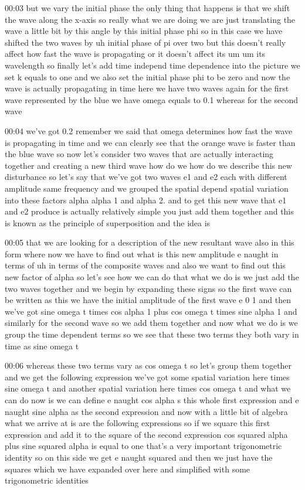 00:03
but we vary the initial phase the only thing that happens
is that we shift the wave along the x-axis so really what we are doing we
are just translating the wave a little bit by this angle
by this initial phase phi so in this case we have shifted
the two waves by uh initial phase of pi over two but this doesn't really affect
how fast the wave is propagating or it doesn't affect its um um its wavelength
so finally let's add time independ time dependence into the picture
we set k equals to one and we also set the initial phase
phi to be zero and now the wave is actually propagating in time
here we have two waves again for the first wave represented by the blue
we have omega equals to 0.1 whereas for the second wave

00:04
we've got 0.2 remember we said that omega determines how fast
the wave is propagating in time and we can clearly see that the orange wave
is faster than the blue wave so now let's consider two waves that are
actually interacting together and creating a new third wave how do we
how do we describe this new disturbance so let's say that we've got two waves e1
and e2 each with different amplitude same frequency and
we grouped the spatial depend spatial variation into these factors
alpha alpha 1 and alpha 2. and to get this new wave that e1 and e2 produce
is actually relatively simple you just add them together and this is known as
the principle of superposition and the idea is

00:05
that we are looking for a description of the new
resultant wave also in this form where now we have to
find out what is this new amplitude e naught in terms of uh in terms of the
composite waves and also we want to find out this new factor of alpha
so let's see how we can do that what we do is
we just add the two waves together and we begin by expanding
these signs so the first wave can be written as this
we have the initial amplitude of the first wave e
0 1 and then we've got sine omega t times cos alpha 1 plus cos omega t
times sine alpha 1 and similarly for the second wave so we add them
together and now what we do is we group the time dependent terms so we see
that these two terms they both vary in time as sine omega t

00:06
whereas these two terms vary as cos omega t so let's group them together
and we get the following expression we've got some spatial
variation here times sine omega t and another spatial variation here times cos
omega t and what we can do now is we can define e naught cos alpha
s this whole first expression and e naught sine alpha as the second expression
and now with a little bit of algebra what we arrive at is
are the following expressions so if we square this first expression and add it
to the square of the second expression cos squared alpha plus sine squared
alpha is equal to one that's a very important trigonometric
identity so on this side we get e naught squared and then we just have
the squares which we have expanded over here
and simplified with some trigonometric identities

